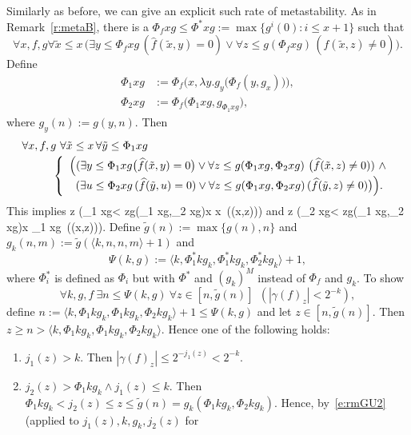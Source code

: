 \begin{rmk}\label{metastable} 
Similarly as before, we can give an explicit such rate of metastability. As in Remark~\ref{r:metaB}, there is a $\Phi_fxg\le\Phi^*xg:=
\max\{ g^i(0):i\le x+1\}$ such that 
\[ \forall x,f,g\forall\tilde{x}\le x\,\big(\exists y\le\Phi_fxg \,(
\widehat{f}(\tilde{x},y)=0)\vee \forall z\le g(\Phi_fxg)\,
(\widehat{f}(\tilde{x},z)\not= 0)\big). \]
Define 
\begin{align*}
\Phi_1 xg&:= \Phi_f\Big(x,\lambda y.g_y\big(\Phi_f(y,g_x)\big)\Big),\\
\Phi_2 xg&:= \Phi_f\big(\Phi_1 xg,g_{\Phi_1 xg}\big),
\end{align*}
where $g_y(n):=g(y,n)$. Then
\[ \ba{l}
\forall x,f,g\ \forall\tilde x\leq x\,\forall \tilde{y}\le \Phi_1xg \\[1mm] 
\hspace*{1cm} \left\{ \ba{l} \Big( 
(\exists y\leq \Phi_1 xg \big(\widehat{f}(\tilde x, y)=0\big) \vee 
\forall z\leq g(\Phi_1 xg,\Phi_2xg)\ \big(\widehat{f}(\tilde x,z)\neq0)) \ 
\wedge \\ \hspace*{2mm}
 (\exists u\le\Phi_2xg\,(\widehat{f}(\tilde{y},u)=0)\vee \forall z\le 
g(\Phi_1xg,\Phi_2xg)\,(\widehat{f}(\tilde{y},z)\not= 0)\big) \Big).
\ea \right. \ea \]
This implies
\be[e:rmGU2]
\forall z \big(\Phi_1 xg< z\leq g(\Phi_1 xg,\Phi_2 xg)\rightarrow \forall \tilde x \leq x\ ((\tilde x,z))\big)
\ee
and
\be[e:rmGU3]
\forall z \big(\Phi_2 xg< z\leq g(\Phi_1 xg,\Phi_2 xg)\rightarrow \forall \tilde x \leq \Phi_1 xg\ ((\tilde x,z))\big).
\ee
Define $\tilde g(n):=\max\{g(n),n\}$ and $g_k(n,m):=\tilde g(\langle k,n,n,m\rangle+1)$ and 
\[
\Psi(k,g):=\langle k,\Phi^*_1 kg_k,\Phi^*_1 kg_k,\Phi^*_2 kg_k\rangle+1,
\]
where $\Phi^*_i$ is defined as $\Phi_i$ but with $\Phi^*$ and $(g_k)^{M}$ instead of $\Phi_f$ and $g_k$.
To show
\[
\forall k,g,f\ \exists n\leq \Psi(k,g)\ \forall z\in[n,\tilde g(n)]\ \ (|\gamma(f)_z| < 2^{-k}), \] 
define $n:=\langle k,\Phi_1 kg_k,\Phi_1 kg_k,\Phi_2 kg_k\rangle+1\leq \Psi(k,g)$ and let $z\in[n,\tilde g(n)]$. Then 
$z\geq n>\langle k,\Phi_1 kg_k,\Phi_1 kg_k,\Phi_2 kg_k\rangle$. Hence one of the following holds:
\begin{enumerate}
\item $j_1(z)>k$. Then $|\gamma(f)_z|\leq2^{-j_1(z)}<2^{-k}$.
\item $j_2(z)>\Phi_1 kg_k\wedge j_1(z)\leq k$. Then 
$
\Phi_1 kg_k < j_2(z)\leq z \leq \tilde g(n)=g_k(\Phi_1 kg_k,\Phi_2 kg_k).
$
Hence, by~\eqref{e:rmGU2} (applied to $j_1(z),k,g_k,j_2(z)$ for 

\end{enumerate}
\end{rmk}

